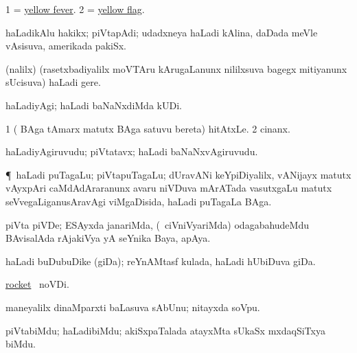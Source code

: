 \bentry
{}
\gl{\nA} 
\bmng
\bnum
\num{1} = \hyperlink{yellow fever}{yellow fever}.  
\num{2} = \hyperlink{yellow flag}{yellow flag}. 
\enum
\emng
\eentry

\bentry
{} 
\gl{\nA} 
\bmng
haLadikAlu hakikx; piVtapAdi; udadxneya haLadi kAlina, daDada meVle vAsisuva, amerikada pakiSx.
\emng
\eentry

\bentry
{}
\gl{\nA} 
\bmng
(\UK nalilx) (rasetxbadiyalilx moVTAru kArugaLanunx nililxsuva bagegx mitiyanunx sUcisuva) haLadi gere.
\emng 
\eentry

\bentry
{} 
\gl{\kirxvi} 
\bmng
haLadiyAgi; haLadi baNaNxdiMda kUDi.
\emng
\eentry

\bentry
{}
\gl{\nA} 
\bmng
\bnum
\num{1} ( BAga tAmarx matutx  BAga satuvu bereta) hitAtxLe. 
\num{2} cinanx.
\enum
\emng
\eentry

\bentry
{} 
\gl{\nA}  
\bmng
haLadiyAgiruvudu;  piVtatavx; haLadi baNaNxvAgiruvudu.
\emng
\eentry

\bentry
{}
\gl{\nA} 
\bmng
\P\ haLadi puTagaLu; piVtapuTagaLu; dUravANi keYpiDiyalilx, vANijayx matutx vAyxpAri caMdAdAraranunx  avaru niVDuva mArATada vasutxgaLu matutx seVvegaLiganusAravAgi viMgaDisida, haLadi puTagaLa BAga.
\emng
\eentry

\bentry
{}
\gl{\nA} 
\bmng
piVta piVDe; ESAyxda janariMda, (\kanmu\ ciVniVyariMda) odagabahudeMdu BAvisalAda rAjakiVya yA seYnika Baya, apAya.
\emng
\eentry

\bentry
{} 
\gl{\nA} 
\bmng
haLadi buDubuDike (giDa); reYnAMtasf kulada, haLadi hUbiDuva giDa.
\emng
\eentry

\bentry
{} 
\gl{\nA} 
\bmng
\hyperref{kandict_r.pdf}{R}{rocket(1) pagu}{rocket} \pagu\ noVDi.
\emng
\eentry

\bentry
{}
\gl{\nA}  
\bmng
maneyalilx dinaMparxti baLasuva sAbUnu; nitayxda soVpu.
\emng
\eentry

\bentry
{}
\gl{\nA}  
\bmng
piVtabiMdu; haLadibiMdu; akiSxpaTalada atayxMta sUkaSx mxdaqSiTxya biMdu. 
\emng
\eentry

